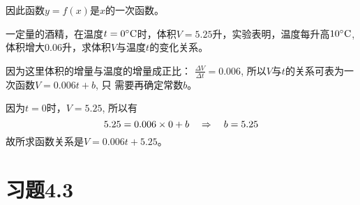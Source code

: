 因此函数$y=f(x)$是$x$的一次函数。    

\begin{example}
    一定量的酒精，在温度$t=0^{\circ}{\rm C}$时，体积$V=5.25$升，实验表明，温度每升高$10^{\circ}{\rm C}$, 体积增大0.06升，求体积$V$与温度$t$的变化关系。
\end{example}    

\begin{solution}
因为这里体积的增量与温度的增量成正比：
$\frac{\Delta V}{\Delta t}= 0.006$, 所以$V$与$t$的关系可表为一次函数$V=0.006t+b$, 只
    需要再确定常数$b$。

    因为$t=0$时，$V=5.25$, 所以有
   \[ 5.25=0.006\times 0+b\quad \Rightarrow\quad b=5.25\]
   故所求函数关系是$V=0.006t+5.25$。
\end{solution}


\section*{习题4.3}
